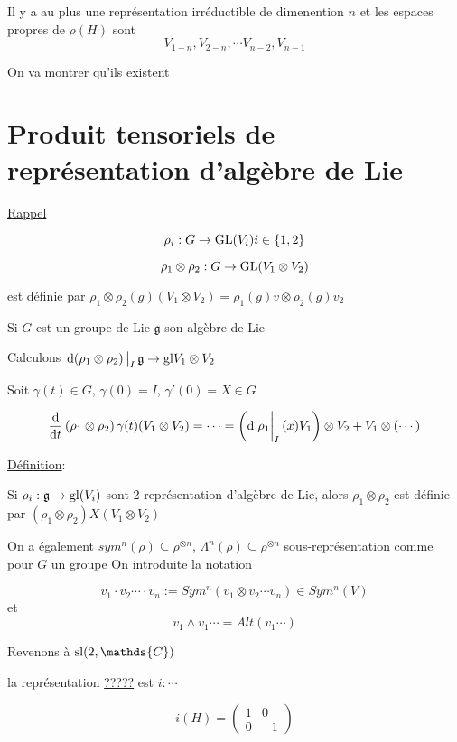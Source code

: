 Il y a au plus une représentation irréductible de dimenention \(n\) et les espaces propres de \(\rho(H)\) sont
\[ V_{1-n}, V_{2-n}, \dotsb V_{n-2}, V_{n-1}  \]

On va montrer qu'ils existent

\section*{Produit tensoriels de représentation d'algèbre de Lie}

\underline{Rappel} 

\[ \rho_i : G \to {\rm{}GL}(V_i ) i \in \{ 1,2 \}    \]

\[ \rho_1 \otimes \rho_2 : G \to {\rm{}GL}(V_1 \otimes V_{2})  \]

est définie par \(\rho_1 \otimes \rho_{2}(g) \left( V_1 \otimes V_2  \right)  = \rho_{1}(g)v \otimes \rho_2 (g) v_2 \) 

Si \(G\) est un groupe de Lie \(\mathfrak{g}\) son algèbre de Lie 

Calculons \(\eval{\dd(\rho_1 \otimes \rho_2)}_{I}  \mathfrak{g} \to {\rm{}gl} V_1 \otimes V_2\)

Soit \(\gamma(t) \in G\), \(\gamma(0)=I\), \( \gamma'(0) = X \in G \) 

\[ \dv{{}}{t} \left( \rho_1 \otimes \rho_2  \right) \gamma(t) (V_1 \otimes V_2)  = \dotsb = \left( \dd \eval{\rho_1 }_{I} (x) V_1  \right) \otimes V_2 + V_1 \otimes ( \dotsb )\]


\underline{Définition}: 


Si \(\rho_i: \mathfrak{g} \to {\rm{}gl} (V_i)\) sont 2 représentation d'algèbre de Lie, alors \(\rho_1 \otimes \rho_2 \) est définie par \(\left( \rho_1 \otimes \rho_2  \right) X  \left( V_1 \otimes V_2  \right) \)

On a également \(sym^{n}(\rho) \subseteq \rho^{ \otimes n}\), \(\Lambda^{n}(\rho) \subseteq \rho^{ \otimes n}\) sous-représentation comme pour \(G\) un groupe
On introduite la notation 

\[ v_1 \cdot v_2 \dotsb \cdot v_n := Sym^{n} (v_1 \otimes v_2 \dotsb v_n) \in Sym^n(V)\]
et \[ v_1 \wedge v_1 \dotsb = Alt(v_1 \dotsb) \] 


Revenons à \({\rm{}sl}(2,\mathds{C})\)

la représentation \underline{?????} est \(i :  \dotsb\) 

\[ i(H) = \begin{pmatrix} 1 & 0 \\ 0 & -1 \end{pmatrix} \]

